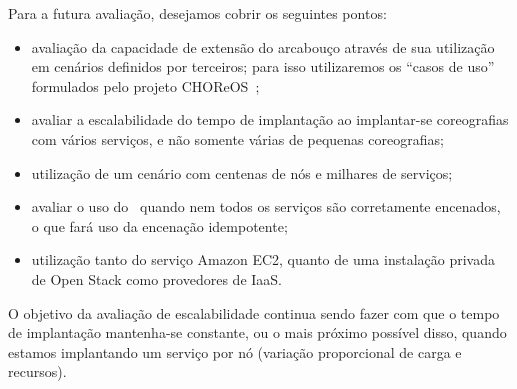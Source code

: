 Para a futura avaliação, desejamos cobrir os seguintes pontos:

\begin{itemize}
\item avaliação da capacidade de extensão do arcabouço através de sua utilização em cenários definidos por terceiros; para isso utilizaremos os ``casos de uso'' formulados pelo projeto CHOReOS~\cite{Choreos2011D6.1, Choreos2011D8.1};
\item avaliar a escalabilidade do tempo de implantação ao implantar-se coreografias com vários serviços, e não somente várias de pequenas coreografias;
\item utilização de um cenário com centenas de nós e milhares de serviços;
\item avaliar o uso do \ee\ quando nem todos os serviços são corretamente encenados, o que fará uso da encenação idempotente;
\item utilização tanto do serviço Amazon EC2, quanto de uma instalação privada de Open Stack como provedores de IaaS.
\end{itemize}

O objetivo da avaliação de escalabilidade continua sendo fazer com que o tempo de implantação mantenha-se constante, ou o mais próximo possível disso, quando estamos implantando um serviço por nó (variação proporcional de carga e recursos).
